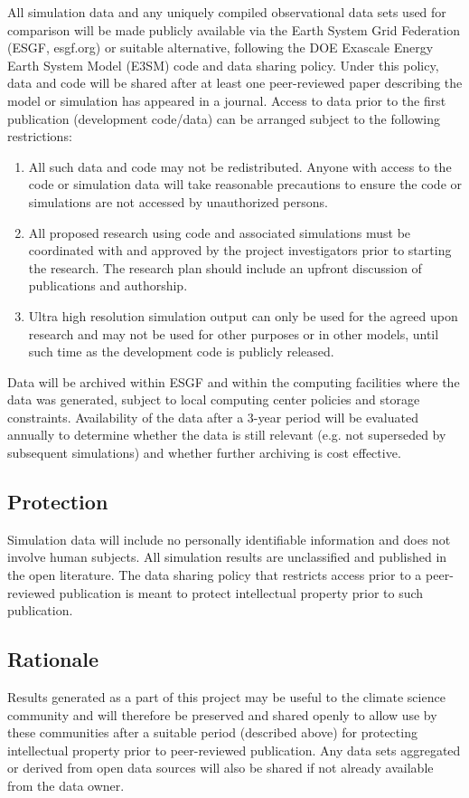 All simulation data and any uniquely compiled observational data sets used for comparison will be made publicly available via the Earth System Grid Federation (ESGF, esgf.org) or suitable alternative, following the DOE Exascale Energy Earth System Model (E3SM) code and data sharing policy. Under this policy, data and code will be shared after at least one peer-reviewed paper describing the model or simulation has appeared in a journal. Access to data prior to the first publication (development code/data) can be arranged subject to the following restrictions:
\begin{enumerate}
\item All such data and code may not be redistributed. Anyone with access to the code or simulation data will take reasonable precautions to ensure the code or simulations are not accessed by unauthorized persons.
\item All proposed research using code and associated simulations must be coordinated with and approved by the project investigators prior to starting the research. The research plan should include an upfront discussion of publications and authorship. 
\item Ultra high resolution simulation output can only be used for the agreed upon research and may not be used for other purposes or in other models, until such time as the development code is publicly released.
\end{enumerate}

Data will be archived within ESGF and within the computing facilities where the data was generated, subject to local computing center policies and storage constraints. Availability of the data after a 3-year period will be evaluated annually to determine whether the data is still relevant (e.g. not superseded by subsequent simulations) and whether further archiving is cost effective.

\subsection{Protection}
Simulation data will include no personally identifiable information and does not involve human subjects. All simulation results are unclassified and published in the open literature. The data sharing policy that restricts access prior to a peer-reviewed publication is meant to protect intellectual property prior to such publication.

\subsection{Rationale}

Results generated as a part of this project may be useful to the climate science community and will therefore be preserved and shared openly to allow use by these communities after a suitable period (described above) for protecting intellectual property prior to peer-reviewed publication. Any data sets aggregated or derived from open data sources will also be shared if not already available from the data owner.